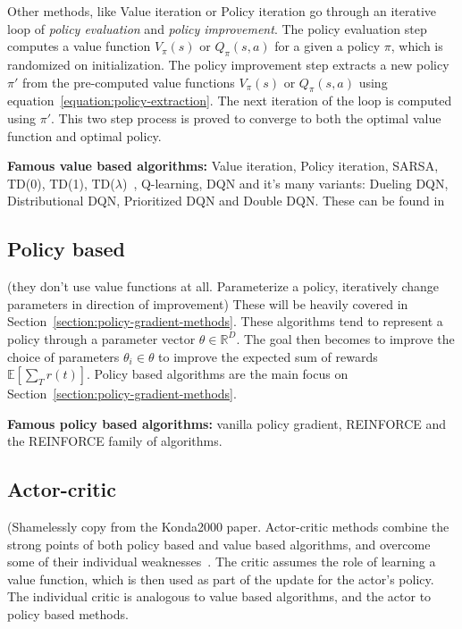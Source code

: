 \documentclass{../main.tex}{}
\begin{document}
Other methods, like Value iteration or Policy iteration go through an iterative loop of \textit{policy evaluation} and \textit{policy improvement}. The policy evaluation step computes a value function $V_{\pi}(s)$ or $Q_{\pi}(s,a)$ for a given a policy $\pi$, which is randomized on initialization. The policy improvement step extracts a new policy $\pi'$ from the pre-computed value functions $V_{\pi}(s)$ or $Q_{\pi}(s,a)$ using equation~\ref{equation:policy-extraction}. The next iteration of the loop is computed using $\pi'$. This two step process is proved to converge to both the optimal value function and optimal policy.

\textbf{Famous value based algorithms:} Value iteration, Policy iteration, SARSA, TD(0), TD(1), TD($\lambda$)~\citep{Sutton1998}, Q-learning, DQN and it's many variants: Dueling DQN, Distributional DQN, Prioritized DQN and Double DQN\@. These can be found in~\citep{Hessel2017}

\subsection{Policy based}
(they don't use value functions at all. Parameterize a policy, iteratively change parameters in direction of improvement)
These will be heavily covered in Section~\ref{section:policy-gradient-methods}. These algorithms tend to represent a policy through a parameter vector $\theta
\in \mathbb{R}^D$. The goal then becomes to improve the choice of parameters
$\theta_i \in \theta$ to improve the expected sum of rewards
$\mathbb{E}[\sum_{T} r(t)]$. Policy based algorithms are the main focus on Section~\ref{section:policy-gradient-methods}.

\textbf{Famous policy based algorithms:} vanilla policy gradient, REINFORCE\citep{Williams1992} and the REINFORCE family of algorithms\@.

\subsection{Actor-critic}

(Shamelessly copy from the Konda2000 paper.
Actor-critic methods combine the strong points of both policy based and value based algorithms, and overcome some of their individual weaknesses~\citep{Konda2000}. The critic assumes the role of learning a value function, which is then used as part of the update for the actor's policy. The individual critic is analogous to value based algorithms, and the actor to policy based methods.
\end{document}
